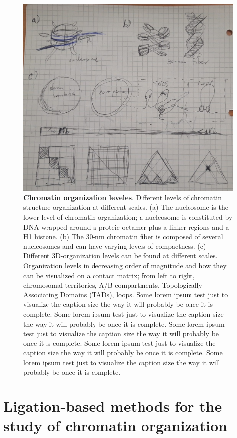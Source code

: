 \begin{figure}
  \centering
  \includegraphics[width=1\textwidth]{chromatin_organization.jpeg}
  \caption{\textbf{Chromatin organization leveles}. Different levels of chromatin structure organization at different scales. (a) The nucleosome is the lower level of chromatin organization; a nucleosome is constituted by DNA wrapped around a proteic octamer plus a linker regions and a H1 histone. (b) The 30-nm chromatin fiber is composed of several nucleosomes and can have varying levels of compactness. (c) Different 3D-organization levels can be found at different scales. Organization levels in decreasing order of magnitude and how they can be visualized on a contact matrix; from left to right, chromosomal territories, A/B compartments, Topologically Associating Domains (TADs), loops. Some lorem ipsum test just to visualize the caption size the way it will probably be once it is complete. Some lorem ipsum test just to visualize the caption size the way it will probably be once it is complete. Some lorem ipsum test just to visualize the caption size the way it will probably be once it is complete. Some lorem ipsum test just to visualize the caption size the way it will probably be once it is complete. Some lorem ipsum test just to visualize the caption size the way it will probably be once it is complete.}
\end{figure}

\section{Ligation-based methods for the study of chromatin organization}

